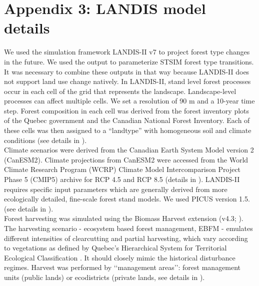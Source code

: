 
\chapter*{\textbf{Appendix 3: LANDIS model details \\ \hspace{1em}}}

\setcounter{chapter}{5}
\setcounter{table}{0}
\setcounter{figure}{0}

We used the simulation framework LANDIS-II v7 \citep{scheller_forest_2004} to project forest type changes in the future. We used the output to parameterize STSIM forest type transitions. It was necessary to combine these outputs in that way because LANDIS-II does not support land use change natively.
In LANDIS-II, stand level forest processes occur in each cell of the grid that represents the landscape. Landscape-level processes can affect multiple cells. 
We set a resolution of 90 m and a 10-year time step. Forest composition in each cell was derived from the forest inventory plots of the Quebec government and the Canadian National Forest Inventory. Each of these cells was then assigned to a “landtype” with homogeneous soil and climate conditions (see details in \cite{boulanger_climate_2019}).\\


Climate scenarios were derived from the Canadian Earth System Model version 2 (CanESM2). Climate projections from CanESM2 were accessed from the World Climate Research Program (WCRP) Climate Model Intercomparison Project Phase 5 (CMIP5) archive for RCP 4.5 and RCP 8.5 (details in \cite{boulanger_climate_2019}).
LANDIS-II requires specific input parameters which are generally derived from more ecologically detailed, fine-scale forest stand models. We used PICUS version 1.5. (see details in \cite{lexer_modified_2001, tremblay_harvesting_2018}). \\


Forest harvesting was simulated using the Biomass Harvest extension (v4.3; \cite{gustafson_spatial_2000}). The harvesting scenario - ecosystem based forest management, EBFM - emulates different intensities of clearcutting and partial harvesting, which vary according to vegetations as defined by Quebec’s Hierarchical System for Territorial Ecological Classification \citep{bergeron_quebec_1992}. It should closely mimic the historical disturbance regimes. Harvest was performed by ‘‘management areas’’: forest management units (public lands) or ecodistricts (private lands, see details in \cite{boulanger_climate_2019}).
